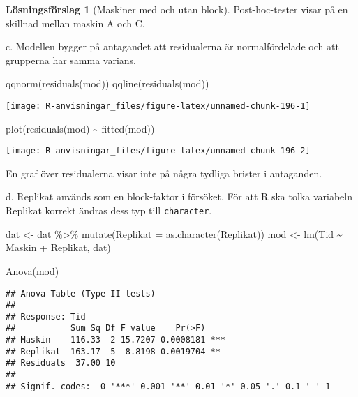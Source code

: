 \documentclass[
]{book}
\newenvironment{Shaded}{\begin{snugshade}}{\end{snugshade}}
\newcommand{\AttributeTok}[1]{\textcolor[rgb]{0.77,0.63,0.00}{#1}}
\newcommand{\FunctionTok}[1]{\textcolor[rgb]{0.00,0.00,0.00}{#1}}
\newcommand{\NormalTok}[1]{#1}
\newcommand{\OtherTok}[1]{\textcolor[rgb]{0.56,0.35,0.01}{#1}}
\newcommand{\SpecialCharTok}[1]{\textcolor[rgb]{0.00,0.00,0.00}{#1}}
\theoremstyle{definition}
\theoremstyle{definition}
\theoremstyle{definition}
\theoremstyle{definition}
\newtheorem{hypothesis}{Lösningsförslag}[chapter]
\theoremstyle{remark}
\begin{document}
\begin{hypothesis}[Maskiner med och utan block]
Post-hoc-tester visar på en skillnad mellan maskin A och C.

c. Modellen bygger på antagandet att residualerna är normalfördelade och att grupperna har samma varians.

\begin{Shaded}
\begin{Highlighting}[]
\FunctionTok{qqnorm}\NormalTok{(}\FunctionTok{residuals}\NormalTok{(mod))}
\FunctionTok{qqline}\NormalTok{(}\FunctionTok{residuals}\NormalTok{(mod))}
\end{Highlighting}
\end{Shaded}

\begin{center}\texttt{[image: R-anvisningar\_files/figure-latex/unnamed-chunk-196-1]} \end{center}

\begin{Shaded}
\begin{Highlighting}[]
\FunctionTok{plot}\NormalTok{(}\FunctionTok{residuals}\NormalTok{(mod) }\SpecialCharTok{\textasciitilde{}} \FunctionTok{fitted}\NormalTok{(mod))}
\end{Highlighting}
\end{Shaded}

\begin{center}\texttt{[image: R-anvisningar\_files/figure-latex/unnamed-chunk-196-2]} \end{center}

En graf över residualerna visar inte på några tydliga brister i antaganden.

d. Replikat används som en block-faktor i försöket. För att R ska tolka variabeln Replikat korrekt ändras dess typ till \texttt{character}.

\begin{Shaded}
\begin{Highlighting}[]
\NormalTok{dat }\OtherTok{\textless{}{-}}\NormalTok{ dat }\SpecialCharTok{\%\textgreater{}\%} \FunctionTok{mutate}\NormalTok{(}\AttributeTok{Replikat =} \FunctionTok{as.character}\NormalTok{(Replikat))}
\NormalTok{mod }\OtherTok{\textless{}{-}} \FunctionTok{lm}\NormalTok{(Tid }\SpecialCharTok{\textasciitilde{}}\NormalTok{ Maskin }\SpecialCharTok{+}\NormalTok{ Replikat, dat)}

\FunctionTok{Anova}\NormalTok{(mod)}
\end{Highlighting}
\end{Shaded}

\begin{verbatim}
## Anova Table (Type II tests)
## 
## Response: Tid
##           Sum Sq Df F value    Pr(>F)    
## Maskin    116.33  2 15.7207 0.0008181 ***
## Replikat  163.17  5  8.8198 0.0019704 ** 
## Residuals  37.00 10                      
## ---
## Signif. codes:  0 '***' 0.001 '**' 0.01 '*' 0.05 '.' 0.1 ' ' 1
\end{verbatim}


\end{hypothesis}
\end{document}
